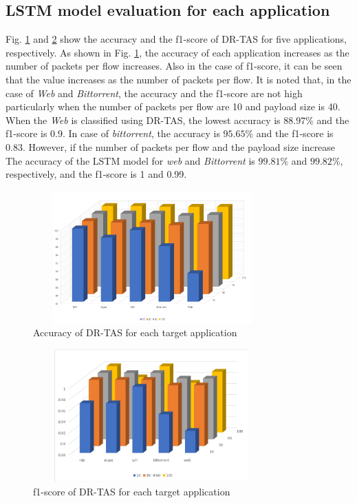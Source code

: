 \documentclass[10pt, twoside, jounal]{IEEEtran}
\begin{document}
\subsection{LSTM model evaluation for each application}
Fig. \ref{fig5} and \ref{fig6} show the accuracy and the f1-score of DR-TAS for five applications, respectively.
As shown in Fig. \ref{fig5}, the accuracy of each application increases as the number of packets per flow increases.
Also in the case of f1-score, it can be seen that the value increases as the number of packets per flow.
It is noted that, in the case of {\it Web} and {\it Bittorrent}, the accuracy and the f1-score are not high particularly when
the number of packets per flow are 10 and payload size is 40.
When the {\it Web} is classified using DR-TAS, the lowest accuracy is $88.97\%$ and the f1-score is 0.9.
In case of {\it bittorrent}, the accuracy is $95.65\%$ and the f1-score is 0.83.
However, if the number of packets per flow and the payload size increase
The accuracy of the LSTM model for {\it web} and {\it Bittorrent} is $99.81\%$ and $99.82\%$, respectively, and the f1-score is 1 and 0.99.

\begin{figure}[!t]
\centering
\setlength{\abovecaptionskip}{0pt}
\setlength{\belowcaptionskip}{0pt}
{
\includegraphics[width=3.6in, height=2.0in]{fig5.jpg}
\caption{Accuracy of DR-TAS for each target application}
\label{fig5}
}
\end{figure}

\begin{figure}[!t]
\centering
\setlength{\abovecaptionskip}{0pt}
\setlength{\belowcaptionskip}{0pt}
{
\includegraphics[width=3.6in, height=2.0in]{fig6.jpg}
\caption{f1-score of DR-TAS for each target application}
\label{fig6}
}
\end{figure}
\end{document}
